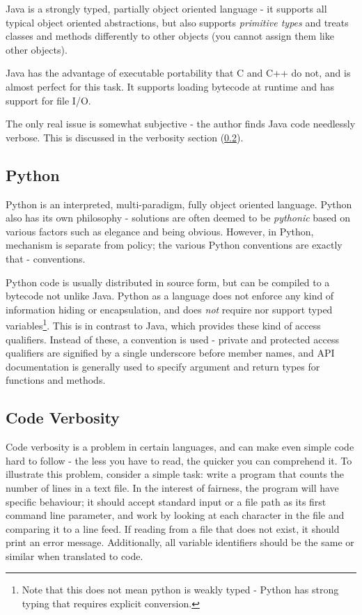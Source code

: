 \documentclass[10pt,a4paper,notitlepage]{report}
\begin{document}
Java is a strongly typed, partially object oriented language - it supports all typical object oriented abstractions, but also supports \emph{primitive types} and treats classes and methods differently to other objects (you cannot assign them like other objects).

Java has the advantage of executable portability that C and C++ do not, and is almost perfect for this task. It supports loading bytecode at runtime and has support for file I/O.

The only real issue is somewhat subjective - the author finds Java code needlessly verbose. This is discussed in the verbosity section (\ref{sec:verbosity}).

\subsection{Python}
Python is an interpreted, multi-paradigm, fully object oriented language. Python also has its own philosophy - solutions are often deemed to be \emph{pythonic} based on various factors such as elegance and being obvious. However, in Python, mechanism is separate from policy; the various Python conventions are exactly that - conventions.

Python code is usually distributed in source form, but can be compiled to a bytecode not unlike Java. Python as a language does not enforce any kind of information hiding or encapsulation, and does \emph{not} require nor support typed variables\footnote{Note that this does not mean python is weakly typed -  Python has strong typing that requires explicit conversion.}. This is in contrast to Java, which provides these kind of access qualifiers. Instead of these, a convention is used - private and protected access qualifiers are signified by a single underscore before member names, and API documentation is generally used to specify argument and return types for functions and methods.

\subsection{Code Verbosity}
\label{sec:verbosity}
Code verbosity is a problem in certain languages, and can make even simple code hard to follow - the less you have to read, the quicker you can comprehend it.
\pagebreak
To illustrate this problem, consider a simple task: write a program that counts the number of lines in a text file.
In the interest of fairness, the program will have specific behaviour; it should accept standard input or a file path as its first command line parameter, and work by looking at each character in the file and comparing it to a line feed. If reading from a file that does not exist, it should print an error message. Additionally, all variable identifiers should be the same or similar when translated to code.
\end{document}
